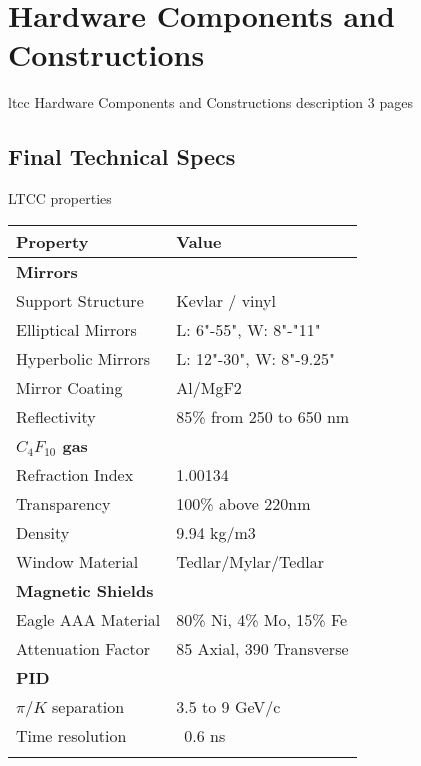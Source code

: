 \section{Hardware Components and Constructions}

ltcc Hardware Components and Constructions description 3 pages

\subsection{Final Technical Specs}


\begin{center}
	LTCC properties\\
	\begin{tabular}{| l | l |}
		\hline \hline
		Property                 & Value \\
		\hline
		{\bf Mirrors}            &                               \\
		Support Structure        & Kevlar / vinyl                \\
		Elliptical Mirrors       & L: 6"-55", W: 8"-"11"         \\
		Hyperbolic Mirrors       & L: 12"-30", W: 8"-9.25"       \\
		Mirror Coating           & Al/MgF2                       \\
		Reflectivity             & 85\% from 250 to 650 nm       \\
		{\bf $C_4F_{10}$ gas}    &                               \\
		Refraction Index         & 1.00134                       \\
		Transparency             & 100\% above 220nm             \\
		Density                  & 9.94 kg/m3                    \\
		Window Material          & Tedlar/Mylar/Tedlar           \\
		{\bf Magnetic Shields}   &                               \\
		Eagle AAA Material       & 80\% Ni, 4\% Mo, 15\% Fe    \\
		Attenuation Factor       &  85 Axial, 390 Transverse     \\
		{\bf PID}                &                               \\
		$\pi/K$ separation       &  3.5 to 9 GeV/c               \\
		Time resolution          &  ~0.6 ns                      \\
		\hline \hline
		\label{tab:ltccProperties}
	\end{tabular}
\end{center}

